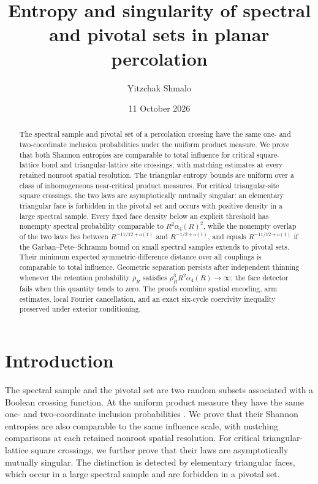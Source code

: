\documentclass[11pt]{amsart}
\title[Entropy and singularity in percolation]{Entropy and singularity of spectral and pivotal sets in planar percolation}
\author{Yitzchak Shmalo}
\date{11 October 2026}
\theoremstyle{remark}
\begin{document}
\begin{abstract}
The spectral sample and pivotal set of a percolation crossing have the same one- and two-coordinate inclusion probabilities under the uniform product measure. We prove that both Shannon entropies are comparable to total influence for critical square-lattice bond and triangular-lattice site crossings, with matching estimates at every retained nonroot spatial resolution. The triangular entropy bounds are uniform over a class of inhomogeneous near-critical product measures. For critical triangular-site square crossings, the two laws are asymptotically mutually singular: an elementary triangular face is forbidden in the pivotal set and occurs with positive density in a large spectral sample. Every fixed face density below an explicit threshold has nonempty spectral probability comparable to $R^2\alpha_4(R)^2$, while the nonempty overlap of the two laws lies between $R^{-11/12+o(1)}$ and $R^{-1/2+o(1)}$, and equals $R^{-11/12+o(1)}$ if the Garban--Pete--Schramm bound on small spectral samples extends to pivotal sets. Their minimum expected symmetric-difference distance over all couplings is comparable to total influence. Geometric separation persists after independent thinning whenever the retention probability $\rho_R$ satisfies $\rho_R^3R^2\alpha_4(R)\to\infty$; the face detector fails when this quantity tends to zero. The proofs combine spatial encoding, arm estimates, local Fourier cancellation, and an exact six-cycle coercivity inequality preserved under exterior conditioning.
\end{abstract}
\maketitle
\enlargethispage{4pt}
\section{Introduction}

The spectral sample and the pivotal set are two random subsets associated with a Boolean crossing function. At the uniform product measure they have the same one- and two-coordinate inclusion probabilities \cite[equations~(2.12) and~(2.13)]{GPS}. We prove that their Shannon entropies are also comparable to the same influence scale, with matching comparisons at each retained nonroot spatial resolution. For critical triangular-lattice square crossings, we further prove that their laws are asymptotically mutually singular. The distinction is detected by elementary triangular faces, which occur in a large spectral sample and are forbidden in a pivotal set.
\end{document}
